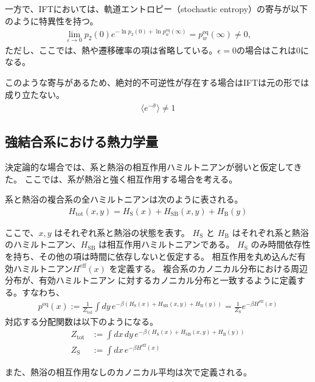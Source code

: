\documentclass[a4paper,11pt]{jsarticle}
\numberwithin{equation}{section}
\begin{document}
一方で、IFTにおいては、軌道エントロピー（stochastic entropy）の寄与が以下のように特異性を持つ。
\begin{align}
\lim_{\varepsilon \to 0} p_2(0) e^{ -\ln p_2(0) + \ln p_w^{\mathrm{eq}}(\infty) }
= p_w^{\mathrm{eq}}(\infty) \ne 0,
\end{align}
ただし、ここでは、熱や遷移確率の項は省略している。$\epsilon =0$の場合はこれは0になる。

このような寄与があるため、絶対的不可逆性が存在する場合はIFTは元の形では成り立たない。
\begin{align}
\langle e^{-\hat{\sigma}} \rangle \neq 1
\end{align}

\subsection{強結合系における熱力学量}

決定論的な場合では、系と熱浴の相互作用ハミルトニアンが弱いと仮定してきた。  
ここでは、系が熱浴と強く相互作用する場合を考える。

系と熱浴の複合系の全ハミルトニアンは次のように表される。
\begin{align}
H_{\text{tot}}(x, y) = H_{\text{S}}(x) + H_{\text{SB}}(x, y) + H_{\text{B}}(y)
\end{align}

ここで、$x, y$ はそれぞれ系と熱浴の状態を表す。
$H_{\text{S}}$ と $H_{\text{B}}$ はそれぞれ系と熱浴のハミルトニアン、$H_{\text{SB}}$ は相互作用ハミルトニアンである。
$H_{\text{S}}$ のみ時間依存性を持ち、その他の項は時間に依存しないと仮定する。
相互作用を丸め込んだ有効ハミルトニアン$H^{\mathrm{eff}}(x)$ を定義する。
複合系のカノニカル分布における周辺分布が、有効ハミルトニアン に対するカノニカル分布と一致するように定義する。すなわち、
\begin{align}
p^{\mathrm{eq}}(x)
:= \frac{1}{Z_{\text{tot}}} \int dy\, e^{-\beta(H_{\text{S}}(x) + H_{\text{SB}}(x,y) + H_{\text{B}}(y))}
= \frac{1}{Z_{\text{S}}} e^{-\beta H^{\mathrm{eff}}(x)}
\end{align}
対応する分配関数は以下のようになる。
\begin{align}
Z_{\text{tot}} &:= \int dx\, dy\, e^{-\beta(H_{\text{S}}(x) + H_{\text{SB}}(x,y) + H_{\text{B}}(y))} \\
Z_{\text{S}} &:= \int dx\, e^{-\beta H^{\mathrm{eff}}(x)}
\end{align}

また、熱浴の相互作用なしのカノニカル平均は次で定義される。
\end{document}
